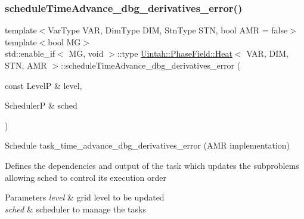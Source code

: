 \subsubsection{\texorpdfstring{schedule\+Time\+Advance\+\_\+dbg\+\_\+derivatives\+\_\+error()}{scheduleTimeAdvance\_dbg\_derivatives\_error()}\hspace{0.1cm}{\footnotesize\ttfamily [2/2]}}
{\footnotesize\ttfamily template$<$Var\+Type V\+AR, Dim\+Type D\+IM, Stn\+Type S\+TN, bool A\+MR = false$>$ \\
template$<$bool MG$>$ \\
std\+::enable\+\_\+if$<$ MG, void $>$\+::type \hyperlink{classUintah_1_1PhaseField_1_1Heat}{Uintah\+::\+Phase\+Field\+::\+Heat}$<$ V\+AR, D\+IM, S\+TN, A\+MR $>$\+::schedule\+Time\+Advance\+\_\+dbg\+\_\+derivatives\+\_\+error (\begin{DoxyParamCaption}\item[{const LevelP \&}]{level,  }\item[{SchedulerP \&}]{sched }\end{DoxyParamCaption})\hspace{0.3cm}{\ttfamily [protected]}}



Schedule task\+\_\+time\+\_\+advance\+\_\+dbg\+\_\+derivatives\+\_\+error (A\+MR implementation) 

Defines the dependencies and output of the task which updates the subproblems allowing sched to control its execution order


\begin{DoxyParams}{Parameters}
{\em level} & grid level to be updated \\
\hline
{\em sched} & scheduler to manage the tasks \\
\hline
\end{DoxyParams}
\mbox{\label{classUintah_1_1PhaseField_1_1Heat_a241faeed94f8958987941d69e1ed2d54}} 
